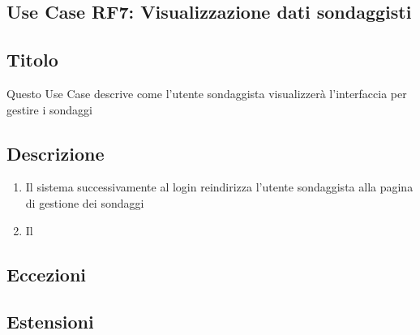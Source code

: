     \subsection{Use Case RF7: Visualizzazione dati sondaggisti}
        \subsection{Titolo}
            Questo Use Case descrive come l'utente sondaggista visualizzerà l'interfaccia per gestire i sondaggi
        \subsection{Descrizione}
            \begin{enumerate}
                \item Il sistema successivamente al login reindirizza l'utente sondaggista alla pagina di gestione dei sondaggi
                \item Il
            \end{enumerate}
        \subsection{Eccezioni}
        \subsection{Estensioni}